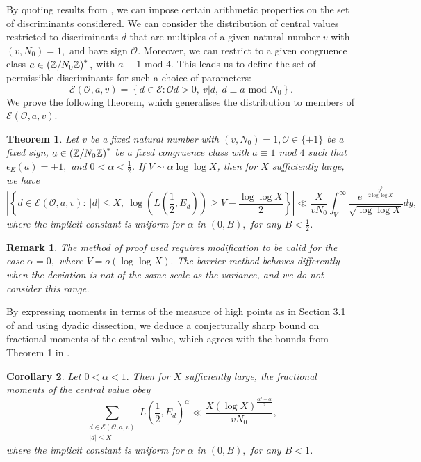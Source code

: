 \documentclass[12pt]{amsart}
\def\Z{\ensuremath\mathbb{Z}}
\numberwithin{equation}{section}
\newtheorem{thm}{Theorem}
\newtheorem{cor}[thm]{Corollary}
\newtheorem*{rem}{Remark}
\numberwithin{thm}{section}
\newcommand{\1}{\mathbf 1}
\begin{document}
 By quoting results from \cite{RS2}, we can impose certain arithmetic properties on the set of discriminants considered. We can consider the distribution of central values restricted to discriminants $d$ that are multiples of a given natural number $v$ with $(v,N_0)=1,$ and have sign $\mathscr{O}$. Moreover, we can restrict to a given congruence class $a\in \left(\Z/N_0\Z\right)^\ast,$ with $a\equiv 1 \text{ mod 4}$. This leads us to define the set of permissible discriminants for such a choice of parameters:
\begin{equation}\label{SS}
	\mathcal{E}(\mathscr{O},a,v)=\left\{d\in \mathcal{E}: \mathscr{O} d>0,\ v|d,\ d\equiv a \text{ mod }N_0\right\}.
\end{equation} We prove the following theorem, which generalises the distribution to members of $	\mathcal{E}(\mathscr{O},a,v)$.\newpage
 \begin{thm} \label{largedevthm} Let $v$ be a fixed natural number with $(v,N_0)=1, \mathscr{O}\in\{\pm 1\}$ be a fixed sign, $a\in \left(\Z/N_0\Z\right)^\ast$ be a fixed congruence class with $a\equiv 1$ mod $4$ such that $\epsilon_E(a)=+1,$ and $0<\alpha<\frac{1}{2}$. If $V\sim \alpha \log\log X$,  then for $X$ sufficiently large, we have
	\begin{equation}\label{eqlargedev}
		\left|\left\{d\in \mathcal{E}(\mathscr{O},a,v):\ |d|\le X,\ \log\left(L\left(\frac{1}{2}, E_d\right)\right)\ge V-\frac{\log\log X}{2}\right\}\right|\ll \frac{X}{vN_0}\int^\infty_V\frac{e^{-\frac{y^2}{2\log\log X}}}{\sqrt{\log\log X}}dy,
	\end{equation}
	where the implicit constant is uniform for $\alpha$ in $(0,B),$ for any $B<\frac{1}{2}$.

\end{thm}
\begin{rem}
	The method of proof used requires modification to be valid for the case $\alpha=0,$ where $V=o(\log\log X).$ The barrier method behaves differently when the deviation is not of the same scale as the variance, and we do not consider this range.
\end{rem}
By expressing moments in terms of the measure of high points as in Section 3.1 of \cite{AB} and using dyadic dissection, we deduce a conjecturally sharp bound on fractional moments of the central value, which agrees with the bounds from Theorem 1 in \cite{RS2}.
\begin{cor}
	Let $0<\alpha<1.$ Then for $X$ sufficiently large, the fractional moments of the central value obey
	\begin{equation}
		\sum_{\substack{d\in \mathcal{E}(\mathscr{O},a,v)\\ |d|\le X}}L\left(\frac{1}{2}, E_d\right)^{\alpha}\ll \frac{X(\log X)^{\frac{\alpha^2-\alpha}{2}} }{vN_0},
	\end{equation}
	where the implicit constant is uniform for $\alpha$ in $(0,B),$ for any $B<1$.
\end{cor}
\end{document}
